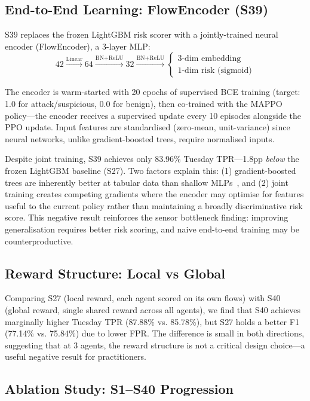 \documentclass[sigconf,nonacm]{acmart}
\begin{document}
\subsection{End-to-End Learning: FlowEncoder (S39)}

S39 replaces the frozen LightGBM risk scorer with a jointly-trained neural encoder (FlowEncoder), a 3-layer MLP:
$$42 \xrightarrow{\text{Linear}} 64 \xrightarrow{\text{BN+ReLU}} 32 \xrightarrow{\text{BN+ReLU}} \begin{cases} 3\text{-dim embedding} \\ 1\text{-dim risk (sigmoid)}\end{cases}$$

The encoder is warm-started with 20 epochs of supervised BCE training (target: 1.0 for attack/suspicious, 0.0 for benign), then co-trained with the MAPPO policy---the encoder receives a supervised update every 10 episodes alongside the PPO update. Input features are standardised (zero-mean, unit-variance) since neural networks, unlike gradient-boosted trees, require normalised inputs.

Despite joint training, S39 achieves only 83.96\% Tuesday TPR---1.8pp \emph{below} the frozen LightGBM baseline (S27). Two factors explain this: (1) gradient-boosted trees are inherently better at tabular data than shallow MLPs~\cite{grinsztajn2022tree}, and (2) joint training creates competing gradients where the encoder may optimise for features useful to the current policy rather than maintaining a broadly discriminative risk score. This negative result reinforces the sensor bottleneck finding: improving generalisation requires better risk scoring, and naive end-to-end training may be counterproductive.

\subsection{Reward Structure: Local vs Global}

Comparing S27 (local reward, each agent scored on its own flows) with S40 (global reward, single shared reward across all agents), we find that S40 achieves marginally higher Tuesday TPR (87.88\% vs. 85.78\%), but S27 holds a better F1 (77.14\% vs. 75.84\%) due to lower FPR. The difference is small in both directions, suggesting that at 3 agents, the reward structure is not a critical design choice---a useful negative result for practitioners.

\subsection{Ablation Study: S1--S40 Progression}
\end{document}
